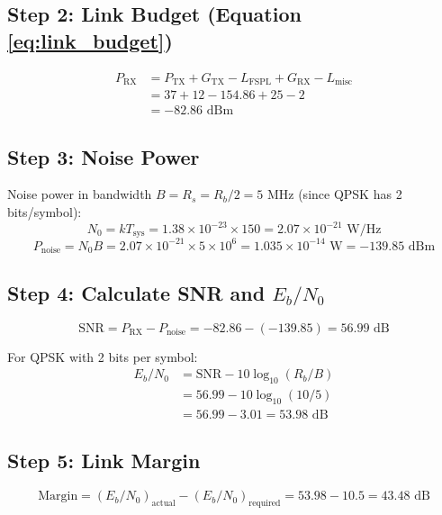 \subsection*{Step 2: Link Budget (Equation \eqref{eq:link_budget})}
\begin{align}
P_{\text{RX}} &= P_{\text{TX}} + G_{\text{TX}} - L_{\text{FSPL}} + G_{\text{RX}} - L_{\text{misc}} \nonumber\\
&= 37 + 12 - 154.86 + 25 - 2 \nonumber\\
&= -82.86 \text{ dBm}
\end{align}

\subsection*{Step 3: Noise Power}
Noise power in bandwidth $B = R_s = R_b/2 = 5$ MHz (since QPSK has 2 bits/symbol):
\begin{equation}
N_0 = k T_{\text{sys}} = 1.38 \times 10^{-23} \times 150 = 2.07 \times 10^{-21} \text{ W/Hz}
\end{equation}
\begin{equation}
P_{\text{noise}} = N_0 B = 2.07 \times 10^{-21} \times 5 \times 10^6 = 1.035 \times 10^{-14} \text{ W} = -139.85 \text{ dBm}
\end{equation}

\subsection*{Step 4: Calculate SNR and $E_b/N_0$}
\begin{equation}
\text{SNR} = P_{\text{RX}} - P_{\text{noise}} = -82.86 - (-139.85) = 56.99 \text{ dB}
\end{equation}

For QPSK with 2 bits per symbol:
\begin{align}
E_b/N_0 &= \text{SNR} - 10\log_{10}(R_b/B) \nonumber\\
&= 56.99 - 10\log_{10}(10/5) \nonumber\\
&= 56.99 - 3.01 = 53.98 \text{ dB}
\end{align}

\subsection*{Step 5: Link Margin}
\begin{equation}
\text{Margin} = (E_b/N_0)_{\text{actual}} - (E_b/N_0)_{\text{required}} = 53.98 - 10.5 = 43.48 \text{ dB}
\end{equation}

